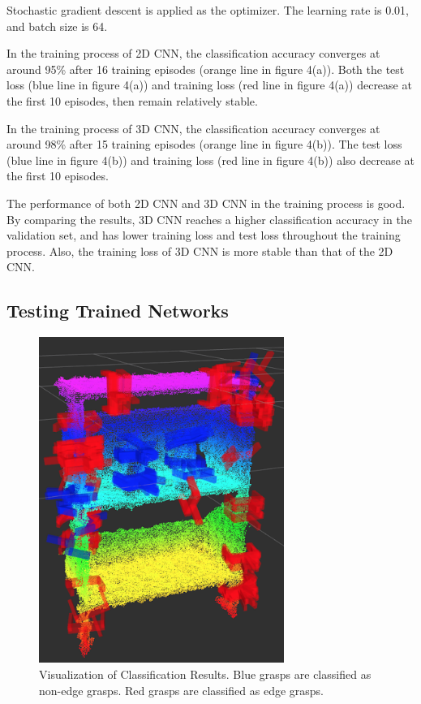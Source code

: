 \documentclass[letterpaper]{article} %
\begin{document}
Stochastic gradient descent is applied as the optimizer. The learning rate is 0.01, and batch size is 64. 

In the training process of 2D CNN, the classification accuracy converges at around 95\% after 16 training episodes (orange line in figure 4(a)). Both the test loss (blue line in figure 4(a)) and training loss (red line in figure 4(a)) decrease at the first 10 episodes, then remain relatively stable. 

In the training process of 3D CNN, the classification accuracy converges at around 98\% after 15 training episodes (orange line in figure 4(b)). The test loss (blue line in figure 4(b)) and training loss (red line in figure 4(b)) also decrease at the first 10 episodes. 

The performance of both 2D CNN and 3D CNN in the training process is good. By comparing the results, 3D CNN reaches a higher classification accuracy in the validation set, and has lower training loss and test loss throughout the training process. Also, the training loss of 3D CNN is more stable than that of the 2D CNN.

\subsection{Testing Trained Networks}
\begin{figure}[H]
    \centering
    \includegraphics[width=8cm]{images/testexample.png}
    \caption{Visualization of Classification Results. Blue grasps are classified as non-edge grasps. Red grasps are classified as edge grasps.}
    \label{fig:my_label}
\end{figure}
\end{document}
